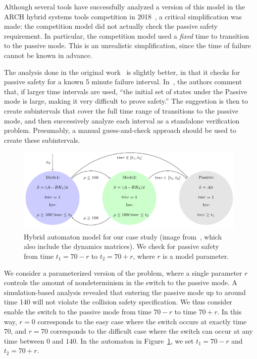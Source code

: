 Although several tools have successfully analyzed a version of this model in the ARCH hybrid systems tools competition in
2018~\cite{archcomp18linear}, a critical simplification was made: the competition model did not actually check the passive safety requirement.
%
In particular, the competition model used a \emph{fixed} time to transition to the passive mode.
%
This is an unrealistic simplification, since the time of failure cannot be known in advance.


The analysis done in the original work~\cite{chan2017verifying} is slightly better, in that it checks for passive safety for a known 5 minute failure interval.
%
In~\cite{chan2017verifying}, the authors comment that, if larger time intervals are used,
``the initial set of states under the Passive mode is large, making it very difficult to prove safety.''
%
The suggestion is then to create subintervals that cover the full time range of transitions to the passive mode, and then successively
analyze each interval as a standalone verification problem.
%
Presumably, a manual guess-and-check approach should be used to create these subintervals.
%

\begin{figure}[t]
\centerline{\includegraphics[width=0.95\columnwidth]{images/ha.png}}
\caption{{\footnotesize Hybrid automaton model for our case study (image from~\cite{chan2017verifying}, which also include the dynamics matrices). We check for passive safety
  from time $t_1=70 - r$ to $t_2=70 + r$, where $r$ is a model parameter.}}
\label{fig:ha}
\end{figure}

We consider a parameterized version of the problem, where a single parameter $r$ controls the amount of nondeterminism in the switch to the passive mode.
%
A simulation-based analysis revealed that entering the passive mode up to around time 140 will not violate the collision safety specification.
%
We thus consider enable the switch to the passive mode from time $70-r$ to time $70+r$.
%
In this way, $r=0$ corresponds to the easy case where the switch
occurs at exactly time $70$, and $r=70$ corresponds to the difficult case where the switch can occur at any time between $0$ and $140$.
%
In the automaton in Figure~\ref{fig:ha}, we set $t_1=70 - r$ and $t_2=70 + r$.

